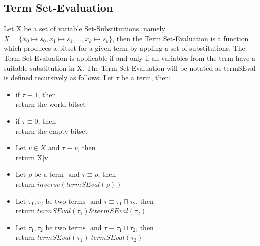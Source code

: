 \documentclass{article}
\begin{document}
	\subsection*{Term Set-Evaluation}
		Let X be a set of variable Set-Substituitions, namely $ X = \{ x_0 \longmapsto s_0, x_1 \longmapsto s_1, ..., x_k \longmapsto s_k \}$,
		then the Term Set-Evaluation is a function which produces a bitset for a given term by appling a set of substitutions.
		The Term Set-Evaluation is applicable if and only if all variables from the term have a suitable substitution in X.
		\newline
		\newline
		The Term Set-Evaluation will be notated as termSEval is defined recursively as follows:
		\newline
		Let $\tau$ be a term, then:
		\begin{itemize}
			\item if $\tau \equiv 1$, then \\
				return the world bitset
			\item if $\tau \equiv 0$, then \\
				return the empty bitset
			\item $\text{Let } v \in X \text{ and } \tau \equiv v$, then \\
				return X[v]
			\item $\text{Let } \rho \text{ be a term } \text{ and } \tau \equiv \overline{\rho}$, then \\
				return $inverse(termSEval(\rho))$ 
			\item $\text{Let } \tau_1, \tau_2 \text{ be two terms } \text{ and } \tau \equiv \tau_1 \sqcap \tau_2$, then \\
				return $termSEval(\tau_1) \& termSEval(\tau_2)$
			\item $\text{Let } \tau_1, \tau_2 \text{ be two terms } \text{ and } \tau \equiv \tau_1 \sqcup \tau_2$, then \\
				return $termSEval(\tau_1) | termSEval(\tau_2)$
		\end{itemize}
\end{document}
